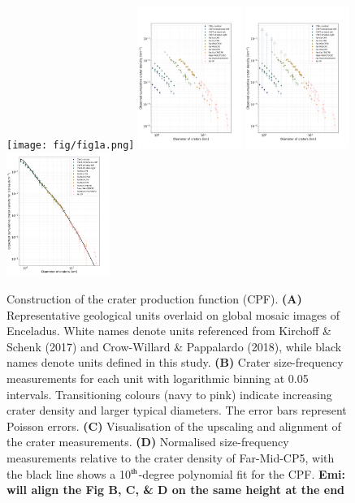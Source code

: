 \documentclass[preprint,11pt,3p,times,authoryear]{elsarticle}
\begin{document}
\begin{figure}[ht!]
    \centering
    \texttt{[image: fig/fig1a.png]}
    \includegraphics[width=0.3\textwidth]{fig/fig1b.png}
    \includegraphics[width=0.3\textwidth]{fig/fig1_arrow.png}
    \includegraphics[width=0.3\textwidth]{fig/fig1c_with_model.png}
    \caption{Construction of the crater production function (CPF).
        \textbf{(A)} Representative geological units overlaid on global mosaic images of Enceladus. White names denote units referenced from Kirchoff \& Schenk (2017) and Crow-Willard \& Pappalardo (2018), while black names denote units defined in this study.
        \textbf{(B)} Crater size-frequency measurements for each unit with logarithmic binning at 0.05 intervals. Transitioning colours (navy to pink) indicate increasing crater density and larger typical diameters. The error bars represent Poisson errors.
        \textbf{(C)} Visualisation of the upscaling and alignment of the crater measurements.
        \textbf{(D)} Normalised size-frequency measurements relative to the crater density of Far-Mid-CP5, with the black line shows a 10$^{\rm th}$-degree polynomial fit for the CPF.
        \textbf{Emi: will align the Fig B, C, \& D on the same height at the end}}
    \label{fig:age}
\end{figure}
\end{document}
